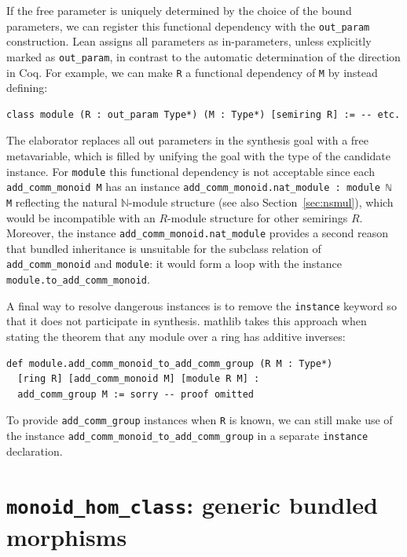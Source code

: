 \documentclass[a4paper,UKenglish,cleveref, autoref, thm-restate]{lipics-v2021}
\newcommand{\mathlib}{\textsf{mathlib}\xspace}
\newcommand{\N}{\mathbb{N}}
\begin{document}
If the free parameter is uniquely determined by the choice of the bound parameters,
we can register this functional dependency with the \lstinline{out_param} construction.
Lean assigns all parameters as in-parameters, unless explicitly marked as \lstinline{out_param},
in contrast to the automatic determination of the direction in Coq.
For example, we can make \lstinline{R} a functional dependency of \lstinline{M} by instead defining:
\begin{lstlisting}
class module (R : out_param Type*) (M : Type*) [semiring R] := -- etc.
\end{lstlisting}
The elaborator replaces all out parameters in the synthesis goal with a free metavariable,
which is filled by unifying the goal with the type of the candidate instance.
For \lstinline{module} this functional dependency is not acceptable
since each \lstinline{add_comm_monoid M} has an instance \lstinline{add_comm_monoid.nat_module : module ℕ M} reflecting the natural $\N$-module structure (see also Section~\ref{sec:nsmul}),
which would be incompatible with an $R$-module structure for other semirings $R$.
Moreover, the instance \lstinline{add_comm_monoid.nat_module} provides a second reason that bundled inheritance is unsuitable for the subclass relation of \lstinline{add_comm_monoid} and \lstinline{module}:
it would form a loop with the instance \lstinline{module.to_add_comm_monoid}.

A final way to resolve dangerous instances is to remove the \lstinline{instance} keyword so that it does not participate in synthesis.
\mathlib takes this approach when stating the theorem that any module over a ring has additive inverses:
\begin{lstlisting}
def module.add_comm_monoid_to_add_comm_group (R M : Type*)
  [ring R] [add_comm_monoid M] [module R M] :
  add_comm_group M := sorry -- proof omitted
\end{lstlisting}
To provide \lstinline{add_comm_group} instances when \lstinline{R} is known,
we can still make use of the instance \lstinline{add_comm_monoid_to_add_comm_group} in a separate \lstinline{instance} declaration.

\section{\lstinline{monoid_hom_class}: generic bundled morphisms} \label{sec:hom-subobject}
\end{document}
